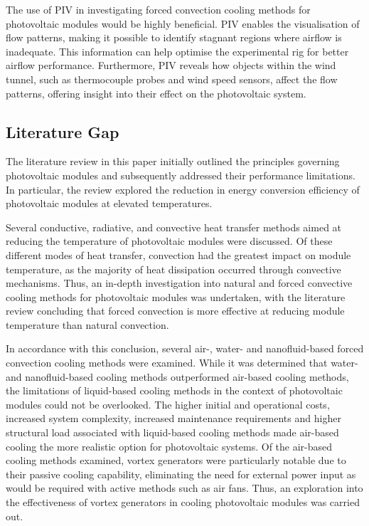 The use of PIV in investigating forced convection cooling methods for photovoltaic modules would be highly beneficial. PIV enables the visualisation of flow patterns, making it possible to identify stagnant regions where airflow is inadequate. This information can help optimise the experimental rig for better airflow performance. Furthermore, PIV reveals how objects within the wind tunnel, such as thermocouple probes and wind speed sensors, affect the flow patterns, offering insight into their effect on the photovoltaic system.

\pagebreak
\subsection{Literature Gap}
The literature review in this paper initially outlined the principles governing photovoltaic modules and subsequently addressed their performance limitations. In particular, the review explored the reduction in energy conversion efficiency of photovoltaic modules at elevated temperatures.\vspace{0.5em} 

Several conductive, radiative, and convective heat transfer methods aimed at reducing the temperature of photovoltaic modules were discussed. Of these different modes of heat transfer, convection had the greatest impact on module temperature, as the majority of heat dissipation occurred through convective mechanisms. Thus, an in-depth investigation into natural and forced convective cooling methods for photovoltaic modules was undertaken, with the literature review concluding that forced convection is more effective at reducing module temperature than natural convection.\vspace{0.5em}

In accordance with this conclusion, several air-, water- and nanofluid-based forced convection cooling methods were examined. While it was determined that water- and nanofluid-based cooling methods outperformed air-based cooling methods, the limitations of liquid-based cooling methods in the context of photovoltaic modules could not be overlooked. The higher initial and operational costs, increased system complexity, increased maintenance requirements and higher structural load associated with liquid-based cooling methods made air-based cooling the more realistic option for photovoltaic systems. Of the air-based cooling methods examined, vortex generators were particularly notable due to their passive cooling capability, eliminating the need for external power input as would be required with active methods such as air fans. Thus, an exploration into the effectiveness of vortex generators in cooling photovoltaic modules was carried out.\vspace{0.5em}

